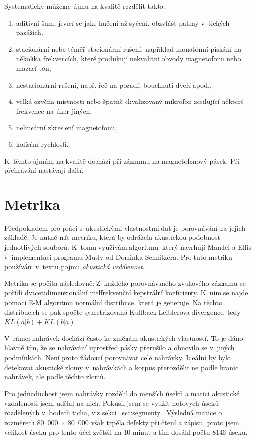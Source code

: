 Systematicky můžeme újmu na kvalitě rozdělit takto:
\begin{enumerate}
\item{
    aditivní šum, jevící se jako hučení až syčení, obzvlášť patrný v~tichých
    pasážích,
}
\item{
    stacionární nebo téměř stacionární rušení, například monotónní pískání na
    několika frekvencích, které produkují nekvalitní obvody magnetofonu
    nebo mazací tón,
}
\item{
    nestacionární rušení, např. řeč na pozadí, bouchnutí dveří apod.,
}
\item{
    velká ozvěna místnosti nebo špatně ekvalizovaný mikrofon zesilující
    některé frekvence na úkor jiných,
}
\item{
    nelineární zkreslení magnetofonu,
}
\item{
    kolísání rychlosti.
}
\end{enumerate}
K~těmto újmám na kvalitě dochází při záznamu na magnetofonový pásek. Při
přehrávání nastávají další.

\section{Metrika}
\label{sec:akustika:metrika}

Předpokladem pro práci s~akustickými vlastnostmi dat je porovnávání na jejich
základě. Je nutné mít metriku, která by odrážela akustickou podobnost
jednotlivých souborů. K~tomu využívám algoritmu, který navrhují Mandel a Ellis\cite{mandel2005song} v~implementaci
programu Musly od Dominka Schnitzera\cite{schnitzer2011using}. Pro tuto metriku
používám v~textu pojmu {\em akustická vzdálenost}.

Metrika se počítá následovně: Z~každého porovnávaného zvukového záznamu se pořídí
dvacetidimenzionální melfrekvenční kepstrální koeficienty. K~nim se najde pomocí
E-M algoritmu normální distribuce, která je generuje. Na těchto distribucích se
pak spočte symetrizovaná Kullback-Leiblerova divergence, tedy
$KL(a|b) + KL(b|a)$.

V~rámci nahrávek dochází často ke změnám akustických vlastností. To je dáno
hlavně tím, že se nahrávání uprostřed pásky přerušilo a obnovilo se v~jiných
podmínkách. Není proto žádoucí porovnávat celé nahrávky. Ideální by bylo
detekovat akustické zlomy v~nahrávkách a korpus přerozdělit ne podle hranic
nahrávek, ale podle těchto zlomů.

Pro jednoduchost jsem nahrávky rozdělil do menších úseků a matici
akustické vzdálenosti jsem udělal na nich. Pokusil jsem se využít hotových úseků rozdělených
v~bodech ticha, viz sekci~\ref{sec:segmenty}. Výsledná matice o rozměrech
80~000 × 80~000 však trpěla defekty při čtení a zápisu, proto jsem velikost
úseků pro tento účel zvětšil na 10 minut a tím dosáhl počtu 8146 úseků.

